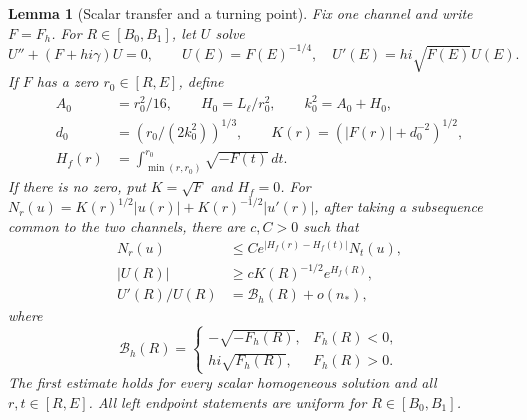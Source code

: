 \documentclass[11pt]{article}
\numberwithin{equation}{section}
\newtheorem{lemma}[theorem]{Lemma}
\theoremstyle{definition}
\theoremstyle{remark}
\begin{document}
\begin{lemma}[Scalar transfer and a turning point]\label{spec:scalar-turn}
Fix one channel and write $F=F_h$. For $R\in[B_0,B_1]$, let $U$ solve
\[
 U''+(F+hi\gamma)U=0,\qquad
 U(E)=F(E)^{-1/4},\quad U'(E)=hi\sqrt{F(E)}U(E).
\]
If $F$ has a zero $r_0\in[R,E]$, define
\begin{equation}\label{spec:turn-scales}
 \begin{split}
 A_0&=r_0^2/16,\qquad H_0=L_\ell/r_0^2,\qquad k_0^2=A_0+H_0,\\
 d_0&=(r_0/(2k_0^2))^{1/3},\qquad
 K(r)=(|F(r)|+d_0^{-2})^{1/2},\\
 H_f(r)&=\int_{\min(r,r_0)}^{r_0}\sqrt{-F(t)}\,dt.
 \end{split}
\end{equation}
If there is no zero, put $K=\sqrt F$ and $H_f=0$.
For $N_r(u)=K(r)^{1/2}|u(r)|+K(r)^{-1/2}|u'(r)|$, after taking a
subsequence common to the two channels, there are $c,C>0$ such that
\begin{align}
 N_r(u)&\le C e^{|H_f(r)-H_f(t)|}N_t(u),\label{spec:scalar-transfer}\\
 |U(R)|&\ge cK(R)^{-1/2}e^{H_f(R)},\label{spec:scalar-value}\\
 U'(R)/U(R)&=\mathcal B_h(R)+o(n_*),\label{spec:scalar-slope}
 \end{align}
where
\[
 \mathcal B_h(R)=
 \begin{cases}-\sqrt{-F_h(R)},&F_h(R)<0,\\
 hi\sqrt{F_h(R)},&F_h(R)>0.
 \end{cases}
\]
The first estimate holds for every scalar homogeneous solution and
all $r,t\in[R,E]$. All left endpoint statements are uniform for
$R\in[B_0,B_1]$.
\end{lemma}
\end{document}
